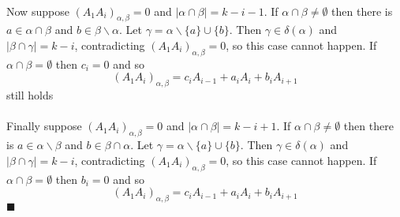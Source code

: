 \documentclass[letterpaper,12pt,oneside,onecolumn]{article}
\newcommand{\1}{\mathbbm{1}}
\begin{document}
\paragraph{}
Now suppose $(A_1A_i)_{\alpha,\beta} = 0$ and $|\alpha \cap \beta| = k-i -1$. If $\alpha \cap \beta \neq \emptyset$ then there is $a \in \alpha \cap \beta$ and $b \in \beta \backslash \alpha$. Let $\gamma = \alpha \backslash\{a\} \cup \{b\}$. Then $\gamma \in \delta(\alpha)$ and $|\beta \cap \gamma| = k-i$, contradicting $(A_1A_i)_{\alpha,\beta} = 0$, so this case cannot happen. If $\alpha \cap \beta = \emptyset$ then $c_i = 0$ and so
$$(A_1A_i)_{\alpha,\beta} = c_i A_{i-1} + a_iA_i + b_iA_{i+1}$$
still holds
\paragraph{}
Finally suppose $(A_1A_i)_{\alpha,\beta} = 0$ and $|\alpha \cap \beta| = k-i +1$. If $\alpha \cap \beta \neq \emptyset$ then there is $a \in \alpha \backslash \beta$ and $b \in \beta \cap \alpha$. Let $\gamma = \alpha \backslash\{a\} \cup \{b\}$. Then $\gamma \in \delta(\alpha)$ and $|\beta \cap \gamma| = k-i$, contradicting $(A_1A_i)_{\alpha,\beta} = 0$, so this case cannot happen. If $\alpha \cap \beta = \emptyset$ then $b_i = 0$ and so
$$(A_1A_i)_{\alpha,\beta} = c_i A_{i-1} + a_iA_i + b_iA_{i+1}$$
$\blacksquare$
\end{document}
